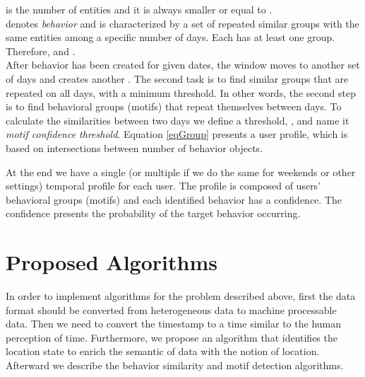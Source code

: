 \documentclass{sig-alternate}
\begin{document}
 is the number of entities and it is always smaller or equal to  .\\
 denotes \emph{behavior} and is characterized by a set of repeated similar groups  with the same entities among a specific number of days. Each  has at least one group. Therefore,  and .\\
After behavior  has been created for given dates, the window moves to another set of days and creates another . The second task is to find similar groups that are repeated on all days, with a minimum threshold. In other words, the second step is to find behavioral groups (motifs) that repeat themselves between days. To calculate the similarities between two days we define a threshold, , and name it \emph{motif confidence threshold}. Equation \ref{eqGroup} presents a user profile, which is based on intersections between  number of behavior objects. 

At the end we have a single (or multiple if we do the same for weekends or other settings) temporal profile for each user. The profile is composed of users' behavioral groups (motifs) and each identified behavior has a confidence. The confidence presents the probability of the target behavior occurring.
\vspace{-0.1cm}
\section{Proposed Algorithms}
In order to implement algorithms for the problem described above, first the data format should be converted from heterogeneous data to machine processable data. Then we need to convert the timestamp to a time similar to the human perception of time. Furthermore, we propose an algorithm that identifies the location state to enrich the semantic of data with the notion of location. Afterward we describe the behavior similarity and motif detection algorithms. 
\end{document}
